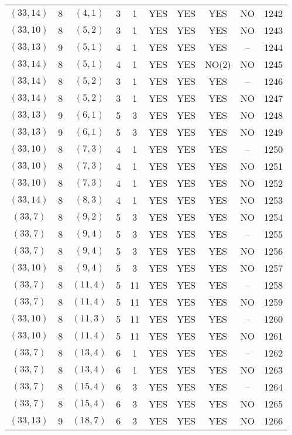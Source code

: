 \begin{longtable}{|c|c|c|c|c|c|c|c|c|c|}
$(33, 14)$ & 8 & $(4, 1)$ & 3 & 1 & YES & YES & YES & NO & 1242\\
$(33, 10)$ & 8 & $(5, 2)$ & 3 & 1 & YES & YES & YES & NO & 1243\\
$(33, 13)$ & 9 & $(5, 1)$ & 4 & 1 & YES & YES & YES & -- & 1244\\
$(33, 14)$ & 8 & $(5, 1)$ & 4 & 1 & YES & YES & NO(2) & NO & 1245\\
$(33, 14)$ & 8 & $(5, 2)$ & 3 & 1 & YES & YES & YES & -- & 1246\\
$(33, 14)$ & 8 & $(5, 2)$ & 3 & 1 & YES & YES & YES & NO & 1247\\
$(33, 13)$ & 9 & $(6, 1)$ & 5 & 3 & YES & YES & YES & NO & 1248\\
$(33, 13)$ & 9 & $(6, 1)$ & 5 & 3 & YES & YES & YES & NO & 1249\\
$(33, 10)$ & 8 & $(7, 3)$ & 4 & 1 & YES & YES & YES & -- & 1250\\
$(33, 10)$ & 8 & $(7, 3)$ & 4 & 1 & YES & YES & YES & NO & 1251\\
$(33, 10)$ & 8 & $(7, 3)$ & 4 & 1 & YES & YES & YES & NO & 1252\\
$(33, 14)$ & 8 & $(8, 3)$ & 4 & 1 & YES & YES & YES & NO & 1253\\
$(33, 7)$ & 8 & $(9, 2)$ & 5 & 3 & YES & YES & YES & NO & 1254\\
$(33, 7)$ & 8 & $(9, 4)$ & 5 & 3 & YES & YES & YES & -- & 1255\\
$(33, 7)$ & 8 & $(9, 4)$ & 5 & 3 & YES & YES & YES & NO & 1256\\
$(33, 10)$ & 8 & $(9, 4)$ & 5 & 3 & YES & YES & YES & NO & 1257\\
$(33, 7)$ & 8 & $(11, 4)$ & 5 & 11 & YES & YES & YES & -- & 1258\\
$(33, 7)$ & 8 & $(11, 4)$ & 5 & 11 & YES & YES & YES & NO & 1259\\
$(33, 10)$ & 8 & $(11, 3)$ & 5 & 11 & YES & YES & YES & -- & 1260\\
$(33, 10)$ & 8 & $(11, 4)$ & 5 & 11 & YES & YES & YES & NO & 1261\\
$(33, 7)$ & 8 & $(13, 4)$ & 6 & 1 & YES & YES & YES & -- & 1262\\
$(33, 7)$ & 8 & $(13, 4)$ & 6 & 1 & YES & YES & YES & NO & 1263\\
$(33, 7)$ & 8 & $(15, 4)$ & 6 & 3 & YES & YES & YES & -- & 1264\\
$(33, 7)$ & 8 & $(15, 4)$ & 6 & 3 & YES & YES & YES & NO & 1265\\
$(33, 13)$ & 9 & $(18, 7)$ & 6 & 3 & YES & YES & YES & NO & 1266\\

\end{longtable}
